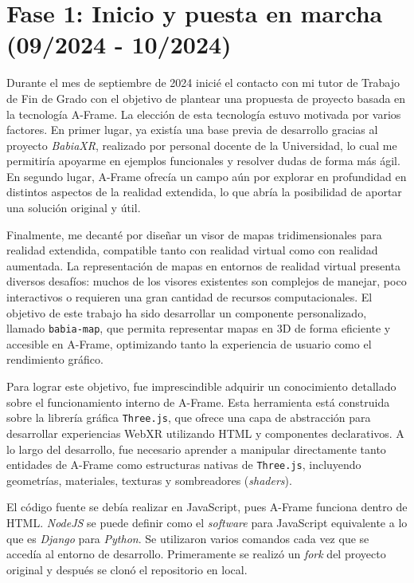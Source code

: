 \documentclass[a4paper, 12pt]{book}
\begin{document}

\section{Fase 1: Inicio y puesta en marcha (09/2024 - 10/2024)}
\label{sec:inicio}

Durante el mes de septiembre de 2024 inicié el contacto con mi tutor de Trabajo de Fin de Grado con el objetivo de plantear una propuesta de proyecto basada en la tecnología A-Frame. La elección de esta tecnología estuvo motivada por varios factores. En primer lugar, ya existía una base previa de desarrollo gracias al proyecto \textit{BabiaXR}, realizado por personal docente de la Universidad, lo cual me permitiría apoyarme en ejemplos funcionales y resolver dudas de forma más ágil. En segundo lugar, A-Frame ofrecía un campo aún por explorar en profundidad en distintos aspectos de la realidad extendida, lo que abría la posibilidad de aportar una solución original y útil.

Finalmente, me decanté por diseñar un visor de mapas tridimensionales para realidad extendida, compatible tanto con realidad virtual como con realidad aumentada. La representación de mapas en entornos de realidad virtual presenta diversos desafíos: muchos de los visores existentes son complejos de manejar, poco interactivos o requieren una gran cantidad de recursos computacionales. El objetivo de este trabajo ha sido desarrollar un componente personalizado, llamado \texttt{babia-map}, que permita representar mapas en 3D de forma eficiente y accesible en A-Frame, optimizando tanto la experiencia de usuario como el rendimiento gráfico.

Para lograr este objetivo, fue imprescindible adquirir un conocimiento detallado sobre el funcionamiento interno de A-Frame. Esta herramienta está construida sobre la librería gráfica \texttt{Three.js}, que ofrece una capa de abstracción para desarrollar experiencias WebXR utilizando HTML y componentes declarativos. A lo largo del desarrollo, fue necesario aprender a manipular directamente tanto entidades de A-Frame como estructuras nativas de \texttt{Three.js}, incluyendo geometrías, materiales, texturas y sombreadores (\textit{shaders}).

El código fuente se debía realizar en JavaScript, pues A-Frame funciona dentro de HTML. \textit{NodeJS} se puede definir como el \textit{software} para JavaScript equivalente a lo que es \textit{Django} para \textit{Python}. Se utilizaron varios comandos cada vez que se accedía al entorno de desarrollo. Primeramente se realizó un \textit{fork} del proyecto original y después se clonó el repositorio en local.
\end{document}
